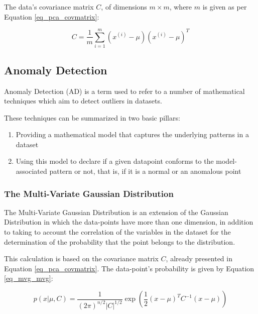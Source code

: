 \documentclass[conference]{IEEEtran}
\begin{document}
The data's covariance matrix $C$, of dimensions $m \times m$, where $m$ is given as per Equation \ref{eq_pca_covmatrix}:

\begin{equation}
	\label{eq_pca_covmatrix}
	C=\frac{1}{m}\sum_{i = 1}^{m}(x^{(i)}-\mu)(x^{(i)}-\mu)^{T}   
\end{equation}




\subsection{Anomaly Detection}
\label{sec_anomaly_detection}
Anomaly Detection (AD) is a term used to refer to a number of mathematical techniques which aim to detect outliers in datasets.

These techniques can be summarized in two basic pillars:

\begin{enumerate}
	\item Providing a mathematical model that captures the underlying patterns in a dataset
	\item Using this model to declare if a given datapoint conforms to the model-associated pattern or not, that is, if it is a normal or an anomalous point
\end{enumerate}



\subsubsection{The Multi-Variate Gaussian Distribution}

The Multi-Variate Gaussian Distribution is an extension of the Gaussian Distribution in which the data-points have more than one dimension, in addition to taking to account the correlation of the variables in the dataset for the determination of the probability that the point belongs to the distribution.

This calculation is based on the covariance matrix $C$, already presented in Equation \ref{eq_pca_covmatrix}. The data-point's probability is given by Equation \ref{eq_mvg_mvg}:

\begin{equation}
	\label{eq_mvg_mvg}
	p(x|\mu,C)=\frac{1}{(2\pi)^{n/2}|C|^{1/2}}\exp{\left(\frac{1}{2}(x-\mu)^{T}C^{-1}(x-\mu)\right) }
\end{equation}
\end{document}
